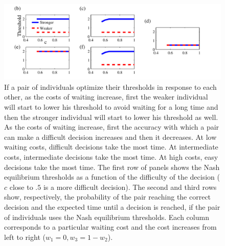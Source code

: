 \documentclass{article}
\begin{document}
\begin{figure}
\includegraphics[width=\textwidth]{nasheq_thresholds.pdf}
\caption{\label{nasheq_thresholds} If a pair of individuals optimize their thresholds in response to each other, as the costs of waiting increase, first the weaker individual will start to lower his threshold to avoid waiting for a long time and then the stronger individual will start to lower his threshold as well.  As the costs of waiting increase, first the accuracy with which a pair can make a difficult decision increases and then it decreases.  At low waiting costs, difficult decisions take the most time.  At intermediate costs, intermediate decisions take the most time.  At high costs, easy decisions take the most time. The first row of panels shows the Nash equilibrium thresholds as a function of the difficulty of the decision ($c$ close to $.5$ is a more difficult decision).  The second and third rows show, respectively, the probability of the pair reaching the correct decision and the expected time until a decision is reached, if the pair of individuals uses the Nash equilibrium thresholds.  Each column corresponds to a particular waiting cost and the cost increases from left to right ($w_1=0, w_3=1-w_2$).  }
\end{figure}
\end{document}
